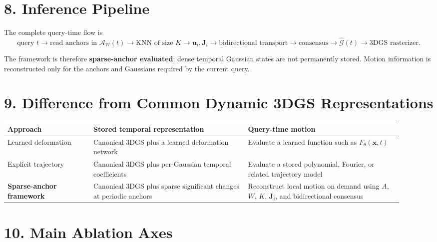 \documentclass[10pt]{article}
\newcommand{\Win}{\mathcal{A}_{W}(t)}
\begin{document}
\section*{8. Inference Pipeline}

The complete query-time flow is
\[
\boxed{
\text{query }t
\rightarrow
\text{read anchors in }\Win
\rightarrow
\text{KNN of size }K
\rightarrow
\mathbf{u}_i,\mathbf{J}_i
\rightarrow
\text{bidirectional transport}
\rightarrow
\text{consensus}
\rightarrow
\hat{\mathcal{G}}(t)
\rightarrow
\text{3DGS rasterizer}
}.
\]

The framework is therefore \textbf{sparse-anchor evaluated}: dense temporal Gaussian states are not permanently stored. Motion information is reconstructed only for the anchors and Gaussians required by the current query.

\section*{9. Difference from Common Dynamic 3DGS Representations}

\renewcommand{\arraystretch}{1.15}
\begin{center}
\small
\begin{tabular}{>{\raggedright\arraybackslash}p{0.20\linewidth}
                >{\raggedright\arraybackslash}p{0.36\linewidth}
                >{\raggedright\arraybackslash}p{0.36\linewidth}}
\toprule
\textbf{Approach} & \textbf{Stored temporal representation} & \textbf{Query-time motion}\\
\midrule
Learned deformation
& Canonical 3DGS plus a learned deformation network
& Evaluate a learned function such as $F_{\theta}(\mathbf{x},t)$\\
\addlinespace
Explicit trajectory
& Canonical 3DGS plus per-Gaussian temporal coefficients
& Evaluate a stored polynomial, Fourier, or related trajectory model\\
\addlinespace
\textbf{Sparse-anchor framework}
& Canonical 3DGS plus sparse significant changes at periodic anchors
& Reconstruct local motion on demand using $A$, $W$, $K$, $\mathbf{J}_i$, and bidirectional consensus\\
\bottomrule
\end{tabular}
\end{center}

\section*{10. Main Ablation Axes}
\end{document}
